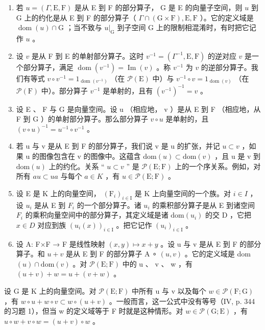 \begin{enumerate}
\def\labelenumi{(\roman{enumi})}
\item
  若 \(u = (\Gamma, \mathrm{E}, \mathrm{F})\) 是从 E 到 F 的部分算子， G 是 E 的向量子空间，则 \(u\) 到 G 上的约化是从 E 到 F 的部分算子（ \(\Gamma \cap (\mathrm{G} \times \mathrm{F}), \mathrm{E}, \mathrm{F}\) ）。它的定义域是 \(\operatorname{dom}(u) \cap \mathrm{G}\) ；当不致与 \(u|_{\mathrm{G}}\) 到子空间 G 上的限制相混淆时，有时把它记作 \(u\) 。
\item
  设 \(v\) 是从 F 到 E 的单射部分算子。这时 \(v^{-1} = (\Gamma^{-1}, \mathrm{E}, \mathrm{F})\) 的逆对应 \(v\) 是一个部分算子，满足 \(\operatorname{dom}(v^{-1}) = \operatorname{Im}(v)\) 。称 \(v^{-1}\) 为 \(v\) 的逆部分算子。我们有等式 \(v \circ v^{-1} = 1_{\operatorname{dom}(v^{-1})}\) （在 \(\mathcal{P}(\mathrm{E})\) 中）与 \(v^{-1} \circ v = 1_{\operatorname{dom}(v)}\) （在 \(\mathcal{P}(\mathrm{F})\) 中）。部分算子 \(v^{-1}\) 是单射的，且有 \((v^{-1})^{-1} = v\) 。
\item
  设 E 、 F 与 G 是向量空间。设 u （相应地， v ）是从 E 到 F （相应地，从 F 到 G ）的单射部分算子。那么部分算子 \(v \circ u\) 是单射的，且 \((v \circ u)^{-1} = u^{-1} \circ v^{-1}\) 。
\item
  若 u 与 v 是从 E 到 F 的部分算子，我们说 v 是 u 的扩张，并记 \(u \subset v\) ，如果 u 的图像包含在 v 的图像中。这蕴含 \(\text{dom}(u) \subset \text{dom}(v)\) ，且 u 是 v 到 \(\text{dom}(u)\) 上的约化。关系 “ \(u \subset v\) ” 是 \(\mathcal{P}(\text{E};\text{F})\) 上的一个序关系。例如，对所有 \(au \subset ua\) 与每个 \(a \in K\) ，有 \(u \in \mathcal{P}(\text{E};\text{F})\) 。
\item
  设 E 是 K 上的向量空间， \((\mathrm{F}_{i})_{i\in\mathrm{I}}\) 是 K 上向量空间的一个族。对 \(i\in I\) ，设 \(u_{i}\) 是从 E 到 \(F_{i}\) 的一个部分算子。诸 \(u_{i}\) 的乘积部分算子是从 E 到诸空间 \(F_{i}\) 的乘积向量空间中的部分算子，其定义域是诸 \(\mathrm{dom}(u_{i})\) 的交 D ，它把 \(x\in D\) 对应到族 \((u_{i}(x))_{i\in\mathrm{I}}\) 。把它记作 \((u_{i})_{i\in\mathrm{I}}\) 。
\item
  设 A: F×F → F 是线性映射 \((x,y)\mapsto x+y\) 。设 u 与 v 是从 E 到 F 的部分算子。和 \(u+v\) 是从 E 到 F 的部分算子 A ∘ \((u,v)\) 。它的定义域是 dom \((u)\cap\text{dom}(v)\) 。对 \(\mathcal{P}(\text{E};\text{F})\) 中的 u 、 v 、 w ，有 \((u+v)+w=u+(v+w)\) 。
\end{enumerate}

设 G 是 K 上的向量空间。对 \(\mathcal{P}(\mathrm{E};\mathrm{F})\) 中所有 u 与 v 以及每个 \(w \in \mathcal{P}(\mathrm{F};\mathrm{G})\) ，有 \(w \circ u + w \circ v \subset w \circ (u + v)\) 。一般而言，这一公式中没有等号（IV, p. 344 的习题 1），但当 w 的定义域等于 F 时就是这种情形。对 \(w \in \mathcal{P}(\mathrm{G};\mathrm{E})\) ，有 \(u \circ w + v \circ w = (u + v) \circ w\) 。

